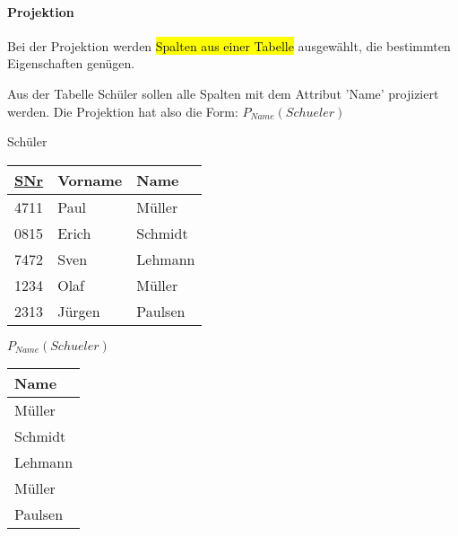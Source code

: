 \paragraph{Projektion} Bei der Projektion werden \hl{Spalten aus einer Tabelle} ausgewählt, die bestimmten Eigenschaften genügen.

Aus der Tabelle Schüler sollen alle Spalten mit dem Attribut 'Name' projiziert werden. 
Die Projektion hat also die Form: $P_{Name}(Schueler)$

\vspace{1em}

\begin{minipage}{.45\textwidth}
	\begin{center}
		Schüler \\
		\vspace{1em}
		\bgroup
		\setlength{\tabcolsep}{1em}
		\def\arraystretch{1.5}
		\begin{tabular}{|c|l|l|}
			\hline
			\rowcolor{tableLightGray}\underline{SNr} & Vorname & Name \\
			\hline
			4711 & Paul & Müller \\
			\hline
			0815 & Erich & Schmidt \\
			\hline
			7472 & Sven & Lehmann \\
			\hline
			1234 & Olaf & Müller \\
			\hline
			2313 & Jürgen & Paulsen \\
			\hline
		\end{tabular}
		\egroup
	\end{center}
\end{minipage}
\hfill
\begin{minipage}{.45\textwidth}
	\begin{center}
		$P_{Name}(Schueler)$ \\
		\vspace{1em}
		\bgroup
		\setlength{\tabcolsep}{1em}
		\def\arraystretch{1.5}
		\begin{tabular}{|l|}
			\hline
			\rowcolor{tableLightGray} Name \\
			\hline
			Müller \\
			\hline
			Schmidt \\
			\hline
			Lehmann \\
			\hline
			Müller \\
			\hline
			Paulsen \\
			\hline
		\end{tabular}
		\egroup
	\end{center}
\end{minipage}


